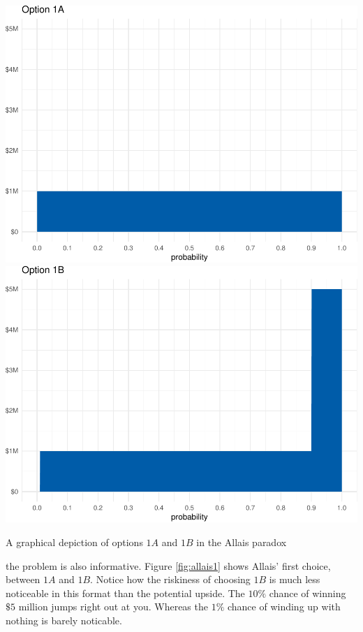 \documentclass[justified]{tufte-book}
\theoremstyle{definition}
\theoremstyle{definition}
\theoremstyle{definition}
\theoremstyle{remark}
\begin{document}
\begin{marginfigure}
\includegraphics{_main_files/figure-latex/allais1-1} \includegraphics{_main_files/figure-latex/allais1-2} \caption[A graphical depiction of options $1A$ and $1B$ in the Allais paradox]{A graphical depiction of options $1A$ and $1B$ in the Allais paradox}\label{fig:allais1}
\end{marginfigure}

 the problem is also informative. Figure \ref{fig:allais1} shows Allais' first choice, between \(1A\) and \(1B\). Notice how the riskiness of choosing \(1B\) is much less noticeable in this format than the potential upside. The \(10\%\) chance of winning \(\$5\) million jumps right out at you. Whereas the \(1\%\) chance of winding up with nothing is barely noticable.
\end{document}
